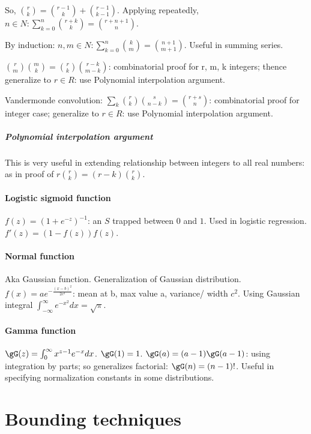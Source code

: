 \documentclass[oneside, article]{memoir}
\begin{document}
So, $\binom{r}{k} = \binom{r-1}{k} + \binom{r-1}{k-1}$. Applying repeatedly, $n \in N: \sum_{k=0}^{n}\binom{r+k}{k} = \binom{r+n+1}{n}$.

By induction: $n,m \in N:\sum_{k=0}^{n} \binom{k}{m} = \binom{n+1}{m+1}$. Useful in summing series.

$\binom{r}{m}\binom{m}{k} = \binom{r}{k}\binom{r-k}{m-k}$: combinatorial proof for r, m, k integers; thence generalize to $r \in R$: use Polynomial interpolation argument.

Vandermonde convolution: $\sum_{k} \binom{r}{k}\binom{s}{n-k} = \binom{r+s}{n}$: combinatorial proof for integer case; generalize to $r \in R$: use Polynomial interpolation argument.

\subsubsection{Polynomial interpolation argument}
This is very useful in extending relationship between integers to all real numbers: as in proof of $r\binom{r}{k} = (r-k)\binom{r}{k}$.

\subsection{Logistic sigmoid function}
$f(z) = (1+e^{-z})^{-1}$: an $S$ trapped between $0$ and $1$. Used in logistic regression. $f'(z) = (1-f(z))f(z)$.

\subsection{Normal function}
Aka Gaussian function. Generalization of Gaussian distribution. \\
$f(x) = ae^{-\frac{(x-b)^{2}}{2c^{2}}}$: mean at b, max value a, variance/ width $c^{2}$. Using Gaussian integral $\int_{-\infty}^{\infty}e^{-x^{2}}dx = \sqrt{\pi}$.

\subsection{Gamma function}
$\gG(z) = \int_{0}^{\infty} x^{z-1}e^{-x}dx$. $\gG(1) = 1$. $\gG(a) = (a-1)\gG(a-1)$: using integration by parts; so generalizes factorial: $\gG(n) = (n-1)!$. Useful in specifying normalization constants in some distributions.


\part{Bounding techniques}
\end{document}
